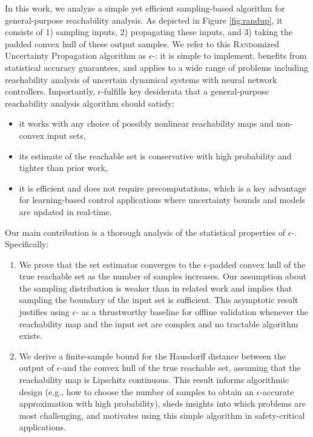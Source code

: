 \documentclass[12pt]{l4dc2022} %
\begin{document}
% 
In this work, we analyze a simple yet efficient sampling-based algorithm for general-purpose reachability analysis. 
% 
% 
% 
% 
% 
% 
As depicted in Figure \ref{fig:randup}, it consists of 1) sampling inputs, 2) propagating these inputs, and 3) taking the padded convex hull of these output samples.   
% 
% 
We refer to this \textsc{Rand}omized \textsc{U}ncertainty \textsc{P}ropagation algorithm as $\epsilon$-\randup: it is simple to implement, 
benefits from statistical accuracy guarantees, 
and
applies to a wide range of problems including reachability analysis of uncertain dynamical systems with neural network controllers. 
Importantly, $\epsilon$-\randup fulfills key desiderata that a general-purpose reachability analysis algorithm should satisfy:
% 
\begin{itemize}[leftmargin=5mm]
\setlength\itemsep{0mm}
\vspace{-1mm}
\item it works with any choice of possibly nonlinear reachability maps and non-convex input sets,
\item its estimate of the reachable set is conservative with high probability and tighter than prior work,
\item it is efficient and does not require precomputations, which is a key advantage for learning-based control applications where uncertainty bounds and models are updated in real-time. 
\end{itemize}
Our main contribution is a thorough analysis of the statistical properties of $\epsilon$-\randup. 
Specifically:
\begin{enumerate}[leftmargin=5mm]
\setlength\itemsep{0mm}
\vspace{-1mm}
\item %
We prove that the %
set estimator converges to the $\epsilon$-padded convex hull of the true reachable set as the number of samples increases. %
Our assumption about the sampling distribution is weaker than in related work and implies that sampling the boundary of the input set is sufficient. %
% 
This asymptotic result justifies using %
$\epsilon$-\randup %
as a thrustworthy baseline for offline validation whenever the reachability map and the input set are complex and no tractable algorithm %
exists. 

\item %
We derive a finite-sample bound for the Hausdorff distance between the output of $\epsilon$-\randup and the convex hull of the true reachable set, %
assuming that the reachability map is Lipschitz continuous. 
This result informs algorithmic design (e.g., how to choose the number of samples to obtain an $\epsilon$-accurate approximation with high probability), 
sheds insights into %
which %
problems are most challenging, 
and motivates using this simple algorithm in safety-critical applications. 
\end{enumerate}
\end{document}
